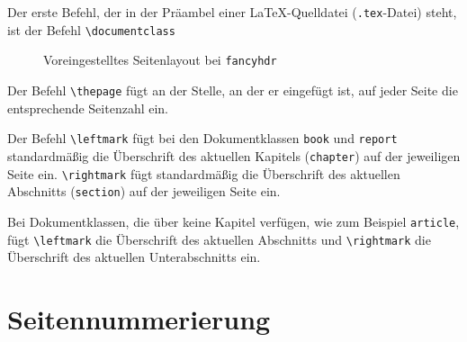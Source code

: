 Der erste Befehl, der in der Präambel einer \LaTeX-Quelldatei (\verb!.tex!-Datei) steht, ist der Befehl \verb!\documentclass!
\begin{document}
\begin{figure}[H]
\begin{minipage}[t]{0.48\textwidth}
\centering
{}
\end{minipage}
\hfill
\begin{minipage}[t]{0.48\textwidth}
\centering
{}
\end{minipage}
\caption[Voreingestelltes Seitenlayout bei \texttt{fancyhdr}]{Voreingestelltes Seitenlayout bei \texttt{fancyhdr}~\cite{GoossensMittelachSamarin2000}}
\label{Abbildungen_fancyhdr_Standardeinstellung}
\end{figure}

Der Befehl \verb!\thepage! fügt an der Stelle, an der er eingefügt ist, auf jeder Seite die entsprechende Seitenzahl ein.

Der Befehl \verb!\leftmark! fügt bei den Dokumentklassen \verb!book! und \verb!report! standardmäßig die Überschrift des aktuellen Kapitels (\verb!chapter!) auf der jeweiligen Seite ein. \verb!\rightmark! fügt standardmäßig die Überschrift des aktuellen Abschnitts (\verb!section!) auf der jeweiligen Seite ein.

Bei Dokumentklassen, die über keine Kapitel verfügen, wie zum Beispiel \verb!article!, fügt  \verb!\leftmark! die Überschrift des aktuellen Abschnitts und \verb!\rightmark! die Überschrift des aktuellen Unterabschnitts ein.

\section{Seitennummerierung}
\end{document}
